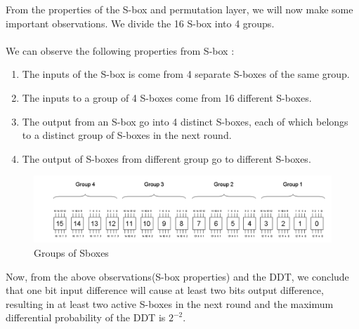 \documentclass[journal=tosc,preprint]{iacrtrans}
\begin{document}
From the properties of the S-box and permutation layer, we will now make some important observations. We divide the 16 S-box into 4 groups.\\\\
 We can observe the following properties from S-box : 
\begin{enumerate}
	\item The inputs of the S-box is come from 4 separate S-boxes of the same group. 
	\item The inputs to a group of 4 S-boxes come from 16 different S-boxes.
	\item The output from an S-box go into 4 distinct S-boxes, each of which belongs to a distinct group of S-boxes in the next round.
	\item The output of S-boxes from different group go to different S-boxes. 
\end{enumerate}
\begin{figure}[h!]
	\centering
	\includegraphics[width=1.0\linewidth, height=0.19\textheight]{groups}
	\caption{Groups of Sboxes}
	\label{fig:groups}
\end{figure}
Now, from the above observations(S-box properties) and the DDT, we conclude that one bit input difference will cause at least two bits output difference, resulting in at least two active S-boxes in the next round and the maximum differential probability of the DDT is $2^{-2}$. 
\end{document}

